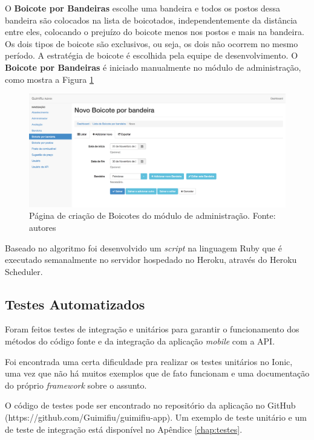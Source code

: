 O \textbf{Boicote por Bandeiras} escolhe uma bandeira e todos os postos dessa bandeira são colocados na lista de boicotados, independentemente da distância entre eles, colocando o prejuízo do boicote menos nos postos e mais na bandeira. Os dois tipos de boicote são exclusivos, ou seja, os dois não ocorrem no mesmo período. A estratégia de boicote é escolhida pela equipe de desenvolvimento. O \textbf{Boicote por Bandeiras} é iniciado manualmente no módulo de administração, como mostra a Figura \ref{img:admin-2}

\begin{figure}[H]
    \centering
    \includegraphics[scale=0.32]{figuras/admin-2.png}
    \caption[Página de criação de Boicotes do módulo de administração]{Página de criação de Boicotes do módulo de administração. Fonte: autores}
    \label{img:admin-2}
\end{figure}

Baseado no algoritmo foi desenvolvido um \textit{script} na linguagem Ruby que é executado semanalmente no servidor hospedado no Heroku, através do Heroku Scheduler.


\subsection{Testes Automatizados}

Foram feitos testes de integração e unitários para garantir o funcionamento dos métodos do código fonte e da integração da aplicação \textit{mobile} com a API.

Foi encontrada uma certa dificuldade pra realizar os testes unitários no Ionic, uma vez que não há muitos exemplos que de fato funcionam e uma documentação do próprio \textit{framework} sobre o assunto.

O código de testes pode ser encontrado no repositório da aplicação no GitHub (https://github.com/Guimifiu/guimifiu-app). Um exemplo de teste unitário e um de teste de integração está disponível no Apêndice \ref{chap:testes}.

